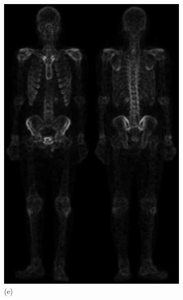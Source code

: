 \begin{figure}[h!]
	\centering
	\begin{subfigure}[b]{0.4\linewidth}
		\includegraphics[width=\linewidth]{myfigure/p2/2-e.png}
		\caption*{(e)}
		\label{fig:2e}
	\end{subfigure}
	\begin{subfigure}[b]{0.4\linewidth}

\end{subfigure}
\end{figure}
